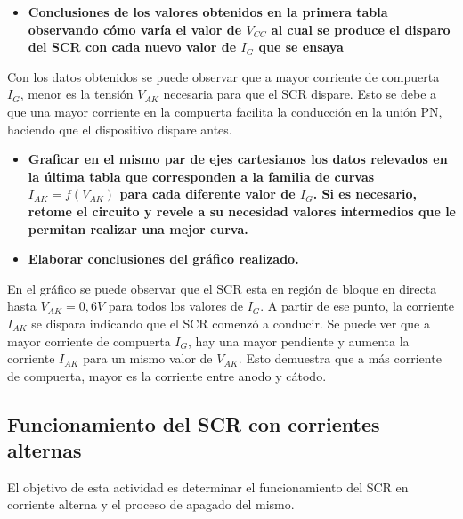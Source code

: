 \begin{itemize}[nosep]

    \item\textbf{Conclusiones de los valores obtenidos en la primera tabla observando cómo varía el valor de $V_{CC}$ al cual se produce el disparo del SCR con cada nuevo valor de $I_G$ que se ensaya}
\end{itemize}

\sangria{} Con los datos obtenidos se puede observar que a mayor corriente de compuerta $I_G$, menor es la tensión $V_{AK}$ necesaria para que el SCR dispare. Esto se debe a que una mayor corriente en la compuerta facilita la conducción en la unión PN, haciendo que el dispositivo dispare antes.
\begin{itemize}[nosep]
    \item\textbf{Graficar en el mismo par de ejes cartesianos los datos relevados en la última tabla que corresponden a la familia de curvas $I_{AK} = f(V_{AK})$ para cada diferente valor de $I_G$. Si es necesario, retome el circuito y revele a su necesidad valores intermedios que le permitan realizar una mejor curva.}

    \item\textbf{Elaborar conclusiones del gráfico realizado.}
\end{itemize}
\sangria{} En el gráfico se puede observar que el SCR esta en región de bloque en directa hasta $V_{AK}=0,6V$ para todos los valores de $I_G$. A partir de ese punto, la corriente $I_{AK}$ se dispara indicando que el SCR comenzó a conducir. Se puede ver que a mayor corriente de compuerta $I_G$, hay una mayor pendiente y aumenta la corriente $I_{AK}$ para un mismo valor de $V_{AK}$. Esto demuestra que a más corriente de compuerta, mayor es la corriente entre anodo y cátodo.  

\subsection{Funcionamiento del SCR con corrientes alternas}
\sangria{} El objetivo de esta actividad es determinar el funcionamiento del SCR en corriente alterna y el proceso de apagado del mismo.
